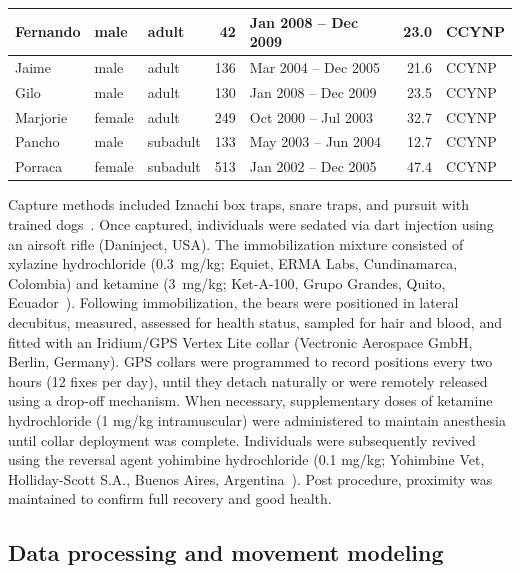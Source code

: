 \documentclass[lineno,referee,pdflatex,sn-vancouver-num]{sn-jnl}%
\theoremstyle{thmstyleone}%
\theoremstyle{thmstyletwo}%
\theoremstyle{thmstylethree}%
\begin{document}
\begin{table}[t]
\begin{tabular}{|l|l|l|r|l|r|l|}
    Fernando  & male   & adult                 &    42 & Jan 2008 -- Dec 2009  & 23.0 & CCYNP \\ \hline
    Jaime     & male   & adult                 &   136 & Mar 2004 -- Dec 2005  & 21.6 & CCYNP \\ \hline
    Gilo      & male   & adult                 &   130 & Jan 2008 -- Dec 2009  & 23.5 & CCYNP \\ \hline
    Marjorie  & female & adult                 &   249 & Oct 2000 -- Jul 2003  & 32.7 & CCYNP \\ \hline
    Pancho    & male   & subadult              &   133 & May 2003 -- Jun 2004  & 12.7 & CCYNP \\ \hline
    Porraca   & female & subadult              &   513 & Jan 2002 -- Dec 2005  & 47.4 & CCYNP \\ \hline
  \end{tabular}
\end{table}

Capture methods included Iznachi box traps, snare traps, and pursuit with trained dogs~\cite{castellanosAndeanBearHome2011,mcdonaldMethodsCapturingFreeRanging2003,allenResearchManagementImplications1985,castellanosMamiferosGrandesMedianos2025}. Once captured, individuals were sedated via dart injection using an airsoft rifle (Daninject, USA). The immobilization mixture consisted of xylazine hydrochloride (0.3~mg/kg; Equiet, ERMA Labs, Cundinamarca, Colombia) and ketamine (3~mg/kg; Ket-A-100, Grupo Grandes, Quito, Ecuador~\cite{castellanosAndeanBearHome2011}).
Following immobilization, the bears were positioned in lateral decubitus, measured, assessed for health status, sampled for hair and blood, and fitted with an Iridium/GPS Vertex Lite collar (Vectronic Aerospace GmbH, Berlin, Germany). GPS collars were programmed to record positions every two hours (12 fixes per day), until they detach naturally or were remotely released using a drop-off mechanism.
When necessary, supplementary doses of ketamine hydrochloride (1 mg/kg intramuscular) were administered to maintain anesthesia until collar deployment was complete. Individuals were subsequently revived using the reversal agent yohimbine hydrochloride (0.1 mg/kg; Yohimbine Vet, Holliday-Scott S.A., Buenos Aires, Argentina~\cite{castellanosHematologicalSerumBiochemical2010}). Post procedure, proximity was maintained to confirm full recovery and good health.

\subsection{Data processing and movement modeling}
\end{document}

